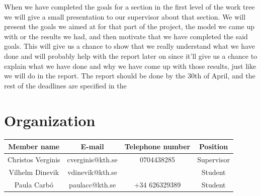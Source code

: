 \documentclass{article}
\begin{document}
\begin{itemize}
		\vspace{2em}
		 When we have completed the goals for a section in the first level of the work tree we will give a small presentation to our supervisor about that section. We will present the goals we aimed at for that part of the project, the model we came up with or the results we had, and then motivate that we have completed the said goals. This will give us a chance to show that we really understand what we have done and will probably help with the report later on since it'll give us a chance to explain what we have done and why we have come up with those results, just like we will do in the report. The report should be done by the 30th of April, and the rest of the deadlines are specified in the 
	\end{itemize}

	\section{Organization}
	\begin{center}
		\begin{tabular}{|c|c|c|c|} \hline
			Member name & E-mail & Telephone number & Position \\ \hline
			Christos Verginis & cverginis@kth.se & 0704438285 & Supervisor \\ \hline
			Vilhelm Dinevik & vdinevik@kth.se & & Student\\ \hline
			Paula Carbó & paulacc@kth.se & +34 626329389 & Student\\ \hline
		\end{tabular}
	\end{center}
	
	
\end{document}
